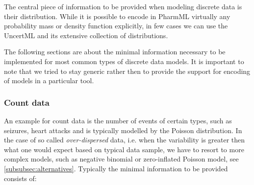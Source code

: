 The central piece of information to be provided when modeling discrete data is 
their distribution. While it is possible to encode in PharmML virtually any 
probability mass or density function explicitly, in few cases we can use the UncertML 
\cite{uncertml3:2014} and its extensive collection of distributions. 

The following sections are about the minimal information necessary to be 
implemented for most common types of discrete data models. It is important to note 
that we tried to stay generic rather then to provide the support for 
encoding of models in a particular tool. 

\subsubsection{Count data}
\label{subsec:mmCountData}
An example for count data is the number of events of certain types, such as seizures, heart attacks and 
is typically modelled by the Poisson distribution. In the case of so called \textit{over-dispersed} 
data, i.e. when the variability is greater then what one would expect based on typical data sample, 
we have to resort to more complex models, such as negative binomial or zero-inflated Poisson model, 
see \ref{subsubsec:alternatives}.
Typically the minimal information to be provided consists of:
